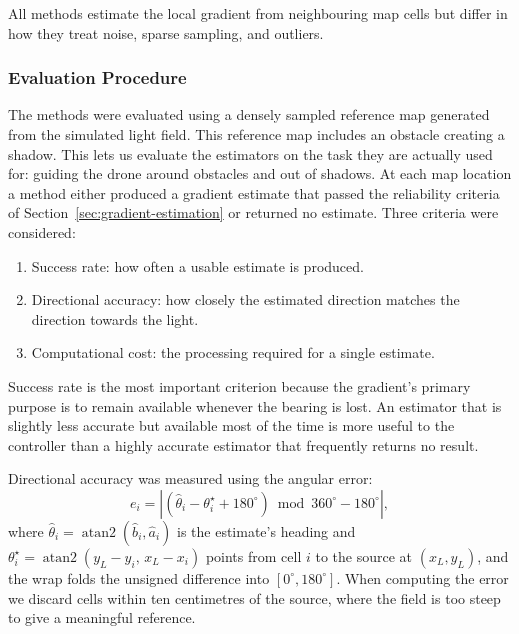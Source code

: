 All methods estimate the local gradient from neighbouring map cells but differ in how they treat noise, sparse sampling, and outliers.

\subsubsection{Evaluation Procedure}

The methods were evaluated using a densely sampled reference map generated from the simulated light field. This reference map includes an obstacle creating a shadow. This lets us evaluate the estimators on the task they are actually used for: guiding the drone around obstacles and out of shadows. At each map location a method either produced a gradient estimate that passed the reliability criteria of Section~\ref{sec:gradient-estimation} or returned no estimate. Three criteria were considered:

\begin{enumerate}
    \item Success rate: how often a usable estimate is produced.
    \item Directional accuracy: how closely the estimated direction matches the
        direction towards the light.
    \item Computational cost: the processing required for a single estimate.
\end{enumerate}

Success rate is the most important criterion because the gradient's primary purpose is to remain available whenever the bearing is lost. An estimator that is slightly less accurate but available most of the time is more useful to the controller than a highly accurate estimator that frequently returns no result.

Directional accuracy was measured using the angular error:
\begin{equation}
e_i = \left| \left( \hat{\theta}_i - \theta_i^\star + 180^\circ \right) \bmod 360^\circ - 180^\circ \right|,
\label{eq:angle-error}
\end{equation}
where $\hat{\theta}_i = \operatorname{atan2}(\hat{b}_i, \hat{a}_i)$ is the estimate's heading and $\theta_i^\star = \operatorname{atan2}(y_L - y_i,\, x_L - x_i)$ points from cell $i$ to the source at $(x_L, y_L)$, and the wrap folds the unsigned difference into $[0^\circ, 180^\circ]$. When computing the error we discard cells within ten centimetres of the source, where the field is too steep to give a meaningful reference.

